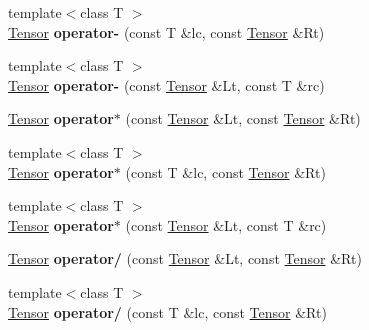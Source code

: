 \begin{DoxyCompactItemize}
\item 
\mbox{\label{namespacecytnx_a7c7bcfb0e14ec9e5317e686b955ea548}} 
{\footnotesize template$<$class T $>$ }\\\hyperlink{classcytnx_1_1Tensor}{Tensor} {\bfseries operator-\/} (const T \&lc, const \hyperlink{classcytnx_1_1Tensor}{Tensor} \&Rt)
\item 
\mbox{\label{namespacecytnx_a7c77b1fa99bea6e243e7e1dab2cb15ab}} 
{\footnotesize template$<$class T $>$ }\\\hyperlink{classcytnx_1_1Tensor}{Tensor} {\bfseries operator-\/} (const \hyperlink{classcytnx_1_1Tensor}{Tensor} \&Lt, const T \&rc)
\item 
\mbox{\label{namespacecytnx_ad579dd62bafd8261a0192a108b0f4b1b}} 
\hyperlink{classcytnx_1_1Tensor}{Tensor} {\bfseries operator$\ast$} (const \hyperlink{classcytnx_1_1Tensor}{Tensor} \&Lt, const \hyperlink{classcytnx_1_1Tensor}{Tensor} \&Rt)
\item 
\mbox{\label{namespacecytnx_ae1925a88cc713abd7d25ad548b7f7c22}} 
{\footnotesize template$<$class T $>$ }\\\hyperlink{classcytnx_1_1Tensor}{Tensor} {\bfseries operator$\ast$} (const T \&lc, const \hyperlink{classcytnx_1_1Tensor}{Tensor} \&Rt)
\item 
\mbox{\label{namespacecytnx_a5f0900c609bcf28f53091f403d8ea859}} 
{\footnotesize template$<$class T $>$ }\\\hyperlink{classcytnx_1_1Tensor}{Tensor} {\bfseries operator$\ast$} (const \hyperlink{classcytnx_1_1Tensor}{Tensor} \&Lt, const T \&rc)
\item 
\mbox{\label{namespacecytnx_aa12ec2394a750ba7e4c29799ec4bd53e}} 
\hyperlink{classcytnx_1_1Tensor}{Tensor} {\bfseries operator/} (const \hyperlink{classcytnx_1_1Tensor}{Tensor} \&Lt, const \hyperlink{classcytnx_1_1Tensor}{Tensor} \&Rt)
\item 
\mbox{\label{namespacecytnx_ac0b24a49371fb7bf2fc2992d1271a59d}} 
{\footnotesize template$<$class T $>$ }\\\hyperlink{classcytnx_1_1Tensor}{Tensor} {\bfseries operator/} (const T \&lc, const \hyperlink{classcytnx_1_1Tensor}{Tensor} \&Rt)

\end{DoxyCompactItemize}
